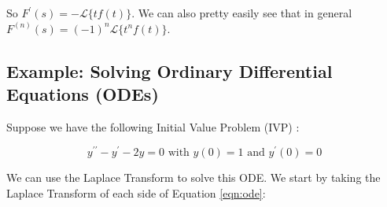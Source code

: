 \documentclass{article}
\theoremstyle{definition}
\begin{document}
\bigskip
\noindent
So $F^\prime(s) = -\mathcal{L}\{tf(t)\}$. We can also pretty easily see that in general $F^{(n)}(s) = (-1)^n \mathcal{L}\{t^n f(t)\}$.

\subsection{Example: Solving Ordinary Differential Equations (ODEs)}
\label{sec:example_ode}
\bigskip
\noindent
Suppose we have the following Initial Value Problem (IVP)  \cite{wiki:initial_value_problem}:

\smallskip
\begin{equation}
y^{\prime \prime} - y^\prime -2y = 0 \text{ with $y(0) = 1$ and $y^\prime (0) = 0$}
\label{eqn:ode}
\end{equation}

\bigskip
\noindent
We can use the Laplace Transform to solve this ODE. We start by taking the Laplace Transform of each side of Equation \ref{eqn:ode}: 
\end{document}
